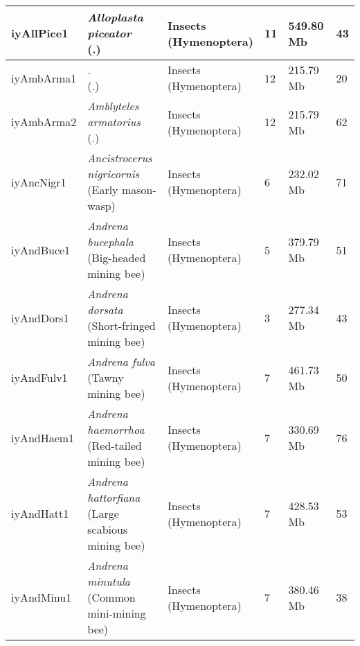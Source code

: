 \begin{centering}
\begin{longtable}{l|l|l|l|l|l}
iyAllPice1 & \makecell[{l}]{\textit{Alloplasta piceator} \\ (.)} & \makecell[{l}]{Insects \\ (Hymenoptera)} & 11 & 549.80 Mb & 43  \\ \hline
iyAmbArma1 & \makecell[{l}]{\textit{.} \\ (.)} & \makecell[{l}]{Insects \\ (Hymenoptera)} & 12 & 215.79 Mb & 20  \\ \hline
iyAmbArma2 & \makecell[{l}]{\textit{Amblyteles armatorius} \\ (.)} & \makecell[{l}]{Insects \\ (Hymenoptera)} & 12 & 215.79 Mb & 62  \\ \hline
iyAncNigr1 & \makecell[{l}]{\textit{Ancistrocerus nigricornis} \\ (Early mason-wasp)} & \makecell[{l}]{Insects \\ (Hymenoptera)} & 6 & 232.02 Mb & 71  \\ \hline
iyAndBuce1 & \makecell[{l}]{\textit{Andrena bucephala} \\ (Big-headed mining bee)} & \makecell[{l}]{Insects \\ (Hymenoptera)} & 5 & 379.79 Mb & 51  \\ \hline
iyAndDors1 & \makecell[{l}]{\textit{Andrena dorsata} \\ (Short-fringed mining bee)} & \makecell[{l}]{Insects \\ (Hymenoptera)} & 3 & 277.34 Mb & 43  \\ \hline
iyAndFulv1 & \makecell[{l}]{\textit{Andrena fulva} \\ (Tawny mining bee)} & \makecell[{l}]{Insects \\ (Hymenoptera)} & 7 & 461.73 Mb & 50  \\ \hline
iyAndHaem1 & \makecell[{l}]{\textit{Andrena haemorrhoa} \\ (Red-tailed mining bee)} & \makecell[{l}]{Insects \\ (Hymenoptera)} & 7 & 330.69 Mb & 76  \\ \hline
iyAndHatt1 & \makecell[{l}]{\textit{Andrena hattorfiana} \\ (Large scabious mining bee)} & \makecell[{l}]{Insects \\ (Hymenoptera)} & 7 & 428.53 Mb & 53  \\ \hline
iyAndMinu1 & \makecell[{l}]{\textit{Andrena minutula} \\ (Common mini-mining bee)} & \makecell[{l}]{Insects \\ (Hymenoptera)} & 7 & 380.46 Mb & 38  \\ \hline

\end{longtable}
\end{centering}
